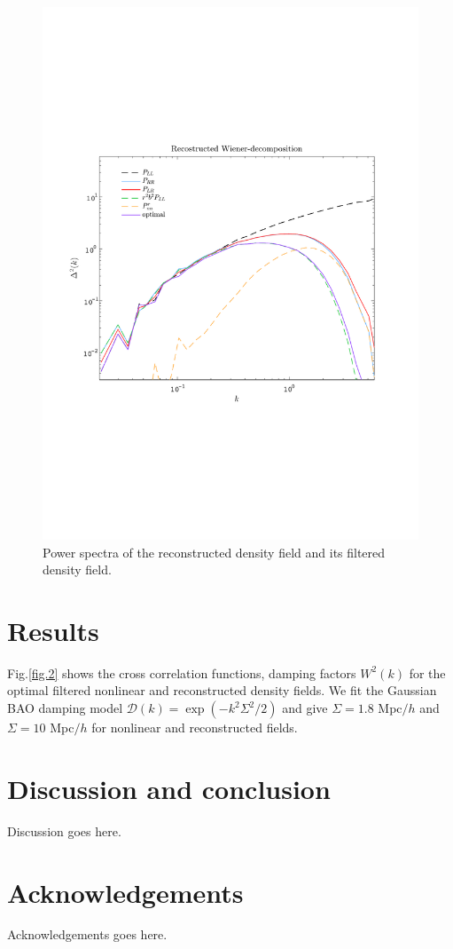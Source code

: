 \documentclass[aps,prd,twocolumn,superscriptaddress,amsfont,amssymb,amsmath,nofootinbib,showpacs,balancelastpage]{revtex4-1}
\begin{document}
\begin{figure}[t] \centering
  \includegraphics[width=1.0\linewidth]{fig4.pdf}
  \caption{Power spectra of the reconstructed density field and its
  filtered density field.}
  \label{fig.4}
\end{figure}

\section{Results}\label{sec.results}
Fig.\ref{fig.2} shows the cross correlation functions,  damping factors $W^2(k)$ for the optimal filtered 
nonlinear and reconstructed density fields. We fit the Gaussian BAO damping model $
{\mathcal D}(k)=\exp(-k^2\Sigma^2/2)$ and give $\Sigma=1.8$ Mpc$/h$ and $\Sigma=10$ 
Mpc$/h$ for nonlinear and reconstructed fields.




\section{Discussion and conclusion}\label{sec.discussion}
Discussion goes here.

\section*{Acknowledgements}
Acknowledgements goes here.

%


\end{document}
